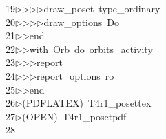 \begin{tabbing}
19\>$\triangleright$\>$\triangleright$\>$\triangleright$\>$\triangleright$\>draw\_poset\ type\_ordinary\ \\[0pt]
20\>$\triangleright$\>$\triangleright$\>$\triangleright$\>$\triangleright$\>draw\_options\ Do\ \\[0pt]
21\>$\triangleright$\>$\triangleright$\>end\ \\[0pt]
22\>$\triangleright$\>$\triangleright$\>with\ Orb\ do\ orbits\_activity\ \\[0pt]
23\>$\triangleright$\>$\triangleright$\>$\triangleright$\>report\ \ \\[0pt]
24\>$\triangleright$\>$\triangleright$\>$\triangleright$\>report\_options\ ro\ \\[0pt]
25\>$\triangleright$\>$\triangleright$\>end\ \\[0pt]
26\>$\triangleright$\>(PDFLATEX)\ T4r1\_posettex\\[0pt]
27\>$\triangleright$\>(OPEN)\ T4r1\_posetpdf\\[0pt]
28\>\end{tabbing}
